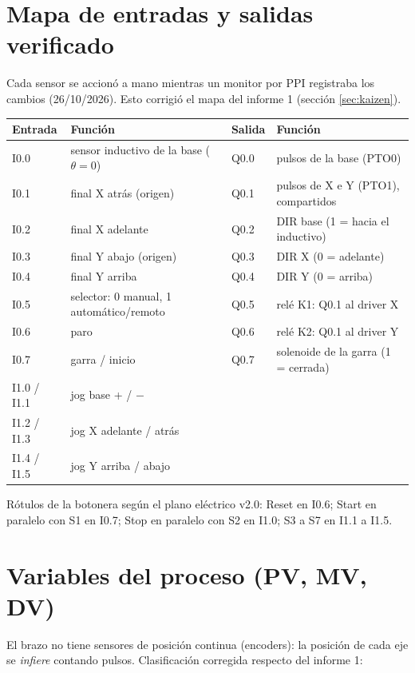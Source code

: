 \section{Mapa de entradas y salidas verificado}
Cada sensor se accionó a mano mientras un monitor por PPI registraba los cambios (26/10/2026). Esto corrigió el mapa del informe 1 (sección \ref{sec:kaizen}).

\begin{center}\small
\begin{tabularx}{\linewidth}{>{\ttfamily}p{1.1cm} >{\raggedright}X >{\ttfamily}p{1.1cm} >{\raggedright\arraybackslash}X}
\toprule
\textbf{\rmfamily Entrada} & \textbf{Función} & \textbf{\rmfamily Salida} & \textbf{Función}\\
\midrule
I0.0 & sensor inductivo de la base ($\theta = 0$) & Q0.0 & pulsos de la base (PTO0)\\
I0.1 & final X atrás (origen) & Q0.1 & pulsos de X e Y (PTO1), compartidos\\
I0.2 & final X adelante & Q0.2 & DIR base (1 = hacia el inductivo)\\
I0.3 & final Y abajo (origen) & Q0.3 & DIR X (0 = adelante)\\
I0.4 & final Y arriba & Q0.4 & DIR Y (0 = arriba)\\
I0.5 & selector: 0 manual, 1 automático/remoto & Q0.5 & relé K1: Q0.1 al driver X\\
I0.6 & paro & Q0.6 & relé K2: Q0.1 al driver Y\\
I0.7 & garra / inicio & Q0.7 & solenoide de la garra (1 = cerrada)\\
I1.0 / I1.1 & jog base + / $-$ & & \\
I1.2 / I1.3 & jog X adelante / atrás & & \\
I1.4 / I1.5 & jog Y arriba / abajo & & \\
\bottomrule
\end{tabularx}
\end{center}
Rótulos de la botonera según el plano eléctrico v2.0: Reset en I0.6; Start en paralelo con S1 en I0.7; Stop en paralelo con S2 en I1.0; S3 a S7 en I1.1 a I1.5.

\section{Variables del proceso (PV, MV, DV)}
El brazo no tiene sensores de posición continua (encoders): la posición de cada eje se \emph{infiere} contando pulsos. Clasificación corregida respecto del informe 1:

